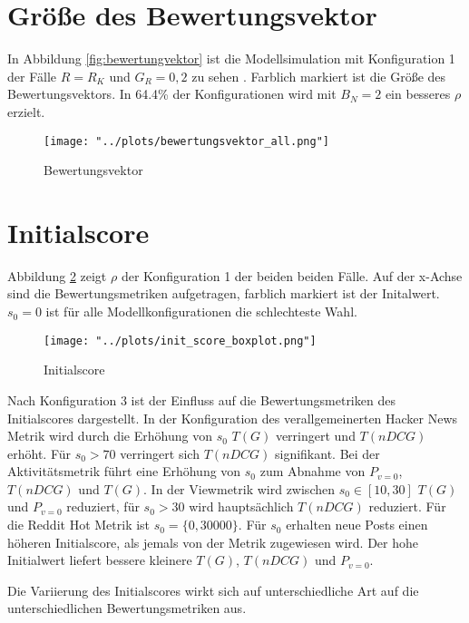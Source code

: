 \section{Größe des Bewertungsvektor}

In Abbildung \ref{fig:bewertungvektor} ist die Modellsimulation mit Konfiguration 1 der Fälle $R = R_K$ und $G_R = {0,2}$ zu sehen . Farblich markiert ist die Größe des Bewertungsvektors. In 64.4\% der Konfigurationen wird mit $B_N = 2$ ein besseres $\rho$ erzielt.

\begin{figure}[!h]
	\label{fig:bewertungsvektor}	
	\texttt{[image: "../plots/bewertungsvektor\_all.png"]}
	\caption{Bewertungsvektor}
\end{figure}

\section{Initialscore}

Abbildung \ref{fig:initscore} zeigt $\rho$ der Konfiguration 1 der beiden beiden Fälle. Auf der x-Achse sind die Bewertungsmetriken aufgetragen, farblich markiert ist der Initalwert. $s_0 = 0$ ist für alle Modellkonfigurationen die schlechteste Wahl.



\begin{figure}[!h]
	\label{fig:initscore}	
	\texttt{[image: "../plots/init\_score\_boxplot.png"]}
	\caption{Initialscore}
\end{figure}


Nach Konfiguration 3 ist der Einfluss auf die Bewertungsmetriken des Initialscores dargestellt. In der Konfiguration des  verallgemeinerten Hacker News Metrik wird durch die Erhöhung von $s_0$ $T(G)$ verringert und $T(nDCG)$ erhöht. Für $s_0 > 70$ verringert sich $T(nDCG)$ signifikant. Bei der Aktivitätsmetrik führt eine Erhöhung von $s_0$ zum Abnahme von $P_{v=0}$, $T(nDCG)$ und $T(G)$. In der Viewmetrik wird zwischen $s_0 \in [10,30]$ $T(G)$ und $P_{v=0}$ reduziert, für $s_0 > 30$ wird hauptsächlich $T(nDCG)$ reduziert. Für die Reddit Hot Metrik ist $s_0 = \{0,30000\}$. Für $s_0$ erhalten neue Posts einen höheren Initialscore, als jemals von der Metrik zugewiesen wird. Der hohe Initialwert liefert bessere kleinere $T(G)$, $T(nDCG)$ und $P_{v=0}$. 

Die Variierung des Initialscores wirkt sich auf unterschiedliche Art auf die unterschiedlichen Bewertungsmetriken aus.

